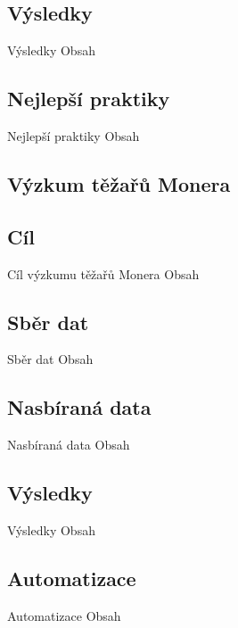 \documentclass{beamer}
\begin{document}
\begin{darkframes}
    \subsection{Výsledky}
    \begin{frame}{Výsledky}
     Obsah
    \end{frame}
    \subsection{Nejlepší praktiky}
    \begin{frame}{Nejlepší praktiky}
     Obsah
    \end{frame}
  \end{darkframes}
  
    
  \begin{darkframes}
    \section{Výzkum těžařů Monera}
    \subsection{Cíl}
    \begin{frame}{Cíl výzkumu těžařů Monera}
     Obsah
    \end{frame}
    \subsection{Sběr dat}
    \begin{frame}{Sběr dat}
     Obsah
    \end{frame}
    \subsection{Nasbíraná data}
    \begin{frame}{Nasbíraná data}
     Obsah
    \end{frame}
    \subsection{Výsledky}
    \begin{frame}{Výsledky}
     Obsah
    \end{frame}
    \subsection{Automatizace}
    \begin{frame}{Automatizace}
     Obsah
    \end{frame}
  \end{darkframes}
  
\end{document}
